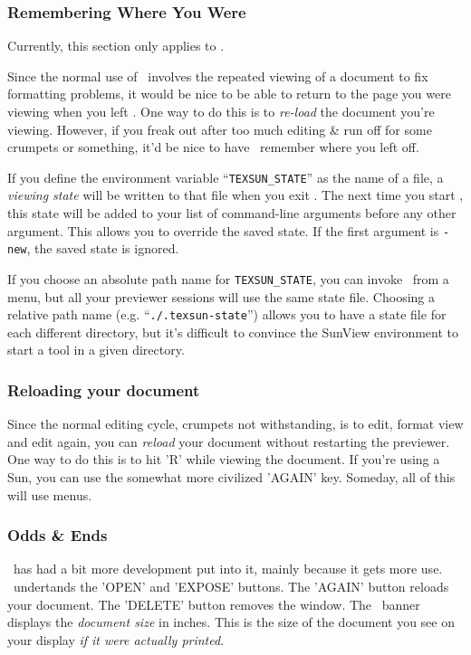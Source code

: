 \subsubsection{Remembering Where You Were}
Currently, this section only applies to \texsun.

Since the normal use of \texsun\ involves the repeated viewing of a document
to fix formatting problems,
it would be nice to be able to return to the page you were viewing when
you left \texsun.
One way to do this is to {\em re-load} the document you're viewing.
However, if you freak out after too much editing \& run off for some
crumpets or something, it'd be nice to have \texsun\ remember where you
left off.

If you define the environment variable ``{\tt TEXSUN\_STATE}'' as the name
of a file, a {\em viewing state} will be written to that file when you
exit \texsun. 
The next time you start \texsun, this state will be added to your list of
command-line arguments before any other argument.
This allows you to override the saved state.
If the first argument is {\tt -new}, the saved state is ignored.

If you choose an absolute path name for {\tt TEXSUN\_STATE},
you can invoke \texsun\ from a menu, but all your previewer
sessions will use the same state file.
Choosing a relative path name (e.g. ``{\tt ./.texsun-state}'') allows
you to have a state file for each different directory, but it's
difficult to convince the SunView environment to start a
tool in a given directory.

\subsubsection{Reloading your document}
Since the normal editing cycle, crumpets not withstanding, is to edit, format
view and edit again, you can {\em reload} your document without restarting
the previewer.
One way to do this is to hit 'R' while viewing the document.
If you're using a Sun, you can use the somewhat more civilized 'AGAIN' key.
Someday, all of this will use menus.

\subsubsection{Odds \& Ends}
\texsun\ has had a bit more development put into it, mainly because it gets
more use. \texsun\ undertands the 'OPEN' and 'EXPOSE' buttons.
The 'AGAIN' button reloads your document.
The 'DELETE' button removes the window.
The \texsun\ banner displays the {\em document size} in inches. 
This is the size of the document you see on your display {\em if it were
actually printed}.

